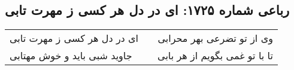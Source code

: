 \begin{center}
\section*{رباعی شماره ۱۷۲۵: ای در دل هر کسی ز مهرت تابی}
\label{sec:1725}
\begin{longtable}{l p{0.5cm} r}
ای در دل هر کسی ز مهرت تابی
&&
وی از تو تضرعی بهر محرابی
\\
جاوید شبی باید و خوش مهتابی
&&
تا با تو غمی بگویم از هر بابی
\\
\end{longtable}
\end{center}
